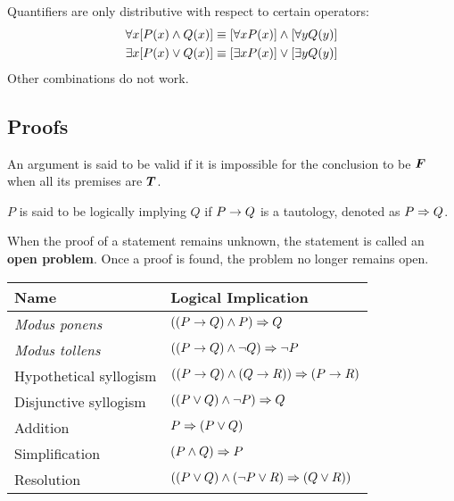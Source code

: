 \begin{remark}
    Quantifiers are only distributive with respect to certain operators:
    \begin{align*}
        \forall x [P(x) \wedge Q(x)] &\equiv [\forall x P(x)] \wedge [\forall y Q(y)] \\
        \exists x [P(x) \vee Q(x)] &\equiv [\exists x P(x)] \vee [\exists y Q(y)]
    \end{align*}
    Other combinations do not work.
\end{remark}

\subsection{Proofs}

\begin{definition}
    An argument is said to be valid if it is impossible for the conclusion to be $\bm{F}$
    when all its premises are $\bm{T}$.
\end{definition}

\begin{definition}
    $P$ is said to be logically implying $Q$ if $P \rightarrow Q$ is a tautology, denoted
    as $P \Rightarrow Q$.
\end{definition}

\begin{definition}
    When the proof of a statement remains unknown, the statement is called an \textbf{open problem}.
    Once a proof is found, the problem no longer remains open.
\end{definition}

\begin{theorem} \quad\par
    \begin{center}
        \begin{tabular}{ll}
            \textbf{Name} & \textbf{Logical Implication} \\
            \hline
            \textit{Modus ponens} & $((P \rightarrow Q) \land P) \Rightarrow Q$ \\
            \textit{Modus tollens} & $((P \rightarrow Q) \land \neg Q) \Rightarrow \neg P$ \\
            Hypothetical syllogism & $((P \rightarrow Q) \land (Q \rightarrow R)) \Rightarrow (P \rightarrow R)$ \\
            Disjunctive syllogism & $((P \lor Q) \land \neg P) \Rightarrow Q$ \\
            Addition & $P \Rightarrow (P \lor Q)$ \\
            Simplification & $(P \land Q) \Rightarrow P$ \\
            Resolution & $((P \lor Q) \land (\neg P \lor R) \Rightarrow (Q \lor R))$
        \end{tabular}
    \end{center}
\end{theorem}

